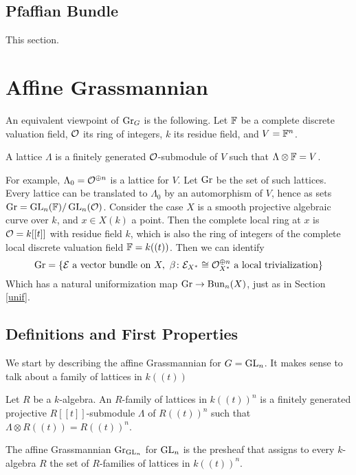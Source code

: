 \documentclass[12pt]{article}
\begin{document}
\subsection{Pfaffian Bundle}
\begin{todo}
    This section.
\end{todo}

\section{Affine Grassmannian}
An equivalent viewpoint of $\operatorname{Gr}_G$ is the following. Let $\mathbb{F}$ be a complete discrete valuation field, $\mathcal{O}$ its ring of integers, $k$ its residue field, and $V = \mathbb{F}^n$.
\begin{defn}
    A lattice $\Lambda$ is a finitely generated $\mathcal{O}$-submodule of $V$ such that $\Lambda \otimes \mathbb{F} = V$.
\end{defn}
For example, $\Lambda_0 = \mathcal{O}^{\oplus n}$ is a lattice for $V$. Let $\operatorname{Gr}$ be the set of such lattices. Every lattice can be translated to $\Lambda_0$ by an automorphism of $V$, hence as sets $\operatorname{Gr} = \operatorname{GL}_n(\mathbb{F})/\operatorname{GL}_n(\mathcal{O})$. Consider the case $X$ is a smooth projective algebraic curve over $k$, and $x \in X(k)$ a point. Then the complete local ring at $x$ is $\mathcal{O} = k[[t]]$ with residue field $k$, which is also the ring of integers of the complete local discrete valuation field $\mathbb{F} = k((t))$. Then we can identify
\[\operatorname{Gr} = \{\mathcal{E} \text{ a vector bundle on } X, \text{ }\beta \colon \mathcal{E}_{X^*} \cong \mathcal{O}_{X^*}^{\oplus n} \text{ a local trivialization}\}\]
Which has a natural uniformization map $\operatorname{Gr} \to \operatorname{Bun}_n(X)$, just as in Section \ref{unif}.

\subsection{Definitions and First Properties}
We start by describing the affine Grassmannian for $G = \operatorname{GL}_n$. It makes sense to talk about a family of lattices in $k((t))$
\begin{defn}
    Let $R$ be a $k$-algebra. An $R$-family of lattices in $k((t))^n$ is a finitely generated projective $R[[t]]$-submodule $\Lambda$ of $R((t))^n$ such that $\Lambda \otimes R((t)) = R((t))^n$.
\end{defn}

\begin{defn}
    The affine Grassmannian $\operatorname{Gr}_{\operatorname{GL}_n}$ for $\operatorname{GL}_n$ is the presheaf that assigns to every $k$-algebra $R$ the set of $R$-families of lattices in $k((t))^n$.
\end{defn}
\end{document}

